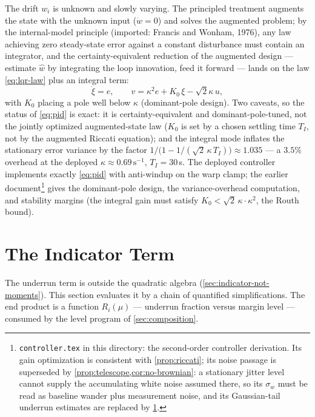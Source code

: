 \documentclass[11pt, a4paper]{article}
\theoremstyle{definition}
\theoremstyle{plain}
\theoremstyle{remark}
\begin{document}
The drift $w_i$ is unknown and slowly varying.  The principled
treatment augments the state with the unknown input ($\dot w = 0$) and
solves the augmented problem; by the internal-model principle
(imported: Francis and Wonham, 1976), any law achieving zero
steady-state error against a constant disturbance must contain an
integrator, and the certainty-equivalent reduction of the augmented
design --- estimate $\hat w$ by integrating the loop innovation, feed
it forward --- lands on the law \cref{eq:lqr-law} plus an integral
term:
\begin{equation}\label{eq:pid}
  \dot\xi = e,
  \qquad
  v = \kappa^2 e + K_0\,\xi - \sqrt2\kappa\,u ,
\end{equation}
with $K_0$ placing a pole well below $\kappa$ (dominant-pole design).
Two caveats, so the status of \cref{eq:pid} is exact:
it is certainty-equivalent and dominant-pole-tuned, not the jointly
optimized augmented-state law ($K_0$ is set by a chosen settling time
$T_I$, not by the augmented Riccati equation); and the integral mode
inflates the stationary error variance by the factor
$1/\bigl(1 - 1/(\sqrt2\,\kappa\,T_I)\bigr) \approx 1.035$ --- a
$3.5\%$ overhead at the deployed
$\kappa \approx 0.69\,\mathrm{s}^{-1}$, $T_I = 30$\,s.  The
deployed controller implements exactly \cref{eq:pid} with anti-windup
on the warp clamp; the earlier document\footnote{\texttt{controller.tex}
in this directory: the second-order controller derivation.  Its gain
optimization is consistent with \cref{prop:riccati}; its noise passage
is superseded by \cref{prop:telescope,cor:no-brownian}: a stationary
jitter level cannot supply the accumulating white noise assumed there,
so its $\sigma_w$ must be read as baseline wander plus measurement
noise, and its Gaussian-tail underrun estimates are replaced by
\cref{sec:indicator}.}
gives the dominant-pole design, the variance-overhead computation, and
stability margins (the integral gain must satisfy
$K_0 < \sqrt2\,\kappa\cdot\kappa^2$, the Routh bound).

\section{The Indicator Term}\label{sec:indicator}

The underrun term is outside the quadratic algebra
(\cref{sec:indicator-not-moments}).  This section evaluates it by a chain
of quantified simplifications.  The end product is a function
$R_i(\mu)$ --- underrun fraction versus margin level --- consumed by the
level program of \cref{sec:composition}.
\end{document}
